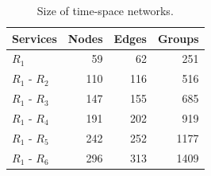 \begin{table}[width=.9\linewidth,cols=4,pos=htbp]
\caption{Size of time-space networks.}\label{tab:BigSize2}
\begin{tabular*}{\tblwidth}{@{} LRRR @{} }
\toprule
Services&Nodes&Edges&Groups\\
\midrule
        $R_1$ &  59 &  62 & 251\\
$R_1$ - $R_2$ & 110 & 116 & 516\\
$R_1$ - $R_3$ & 147 & 155 & 685\\
$R_1$ - $R_4$ & 191 & 202 & 919\\
$R_1$ - $R_5$ & 242 & 252 &1177\\
$R_1$ - $R_6$ & 296 & 313 &1409\\
\bottomrule
\end{tabular*}
\end{table}

